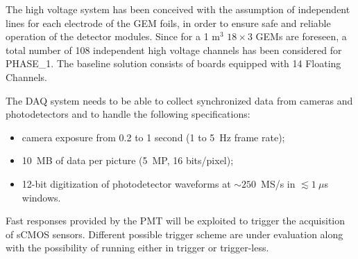 \documentclass[physics,article,submit,moreauthors,pdftex]{Definitions/mdpi}
\begin{document}

The high voltage system has been conceived with the assumption of independent lines 
for each electrode of the GEM foils, in order to ensure safe and reliable 
operation of the detector modules. 
Since for a 1 m$^3$ $18 \times 3$ GEMs are foreseen, a total number of 108 independent high voltage channels has been considered for PHASE\_1. The baseline  solution consists of boards equipped with 14 Floating Channels.

The DAQ system needs to be able to collect synchronized data from cameras and photodetectors and to handle the following specifications: 
\begin{itemize}
    \item camera exposure from 0.2 to 1 second (1 to 5~Hz frame rate);
    \item 10~MB of data per picture (5~MP, 16 bits/pixel); 
    \item 12-bit digitization of photodetector waveforms at $\sim 250$~MS/s in $\lesssim 1~\mu$s windows.
\end{itemize}
Fast responses provided by the PMT will be exploited to trigger the acquisition of sCMOS sensors. Different possible trigger scheme are under evaluation along with the possibility of running either in trigger or trigger-less.
 
\end{document}
